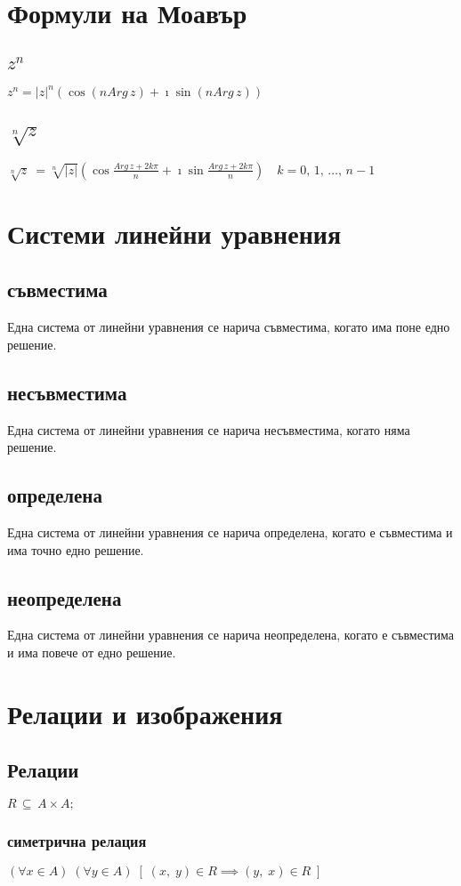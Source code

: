 \documentclass[12pt]{article}
\begin{document}
    \section{Формули на Моавър}
    \subsection{\(z^n\)}
    \(z^n = |z|^n(\cos{\left(nArg\,z\right)} + \imath\sin{\left(nArg\,z\right)})\)
    \subsection{\(\sqrt[n]z\)}
    \(\sqrt[n]z\ = \sqrt[n]{|z|}(\cos{\frac{Arg\,z + 2k\pi}{n}} + \imath\sin{\frac{Arg\,z + 2k\pi}{n}}) \quad k = 0, \, 1, \, \dots, \, n - 1\)
    \section{Системи линейни уравнения}
    \subsection{съвместима}
    Една система от линейни уравнения се нарича съвместима, когато има поне едно решение.
    \subsection{несъвместима}
    Една система от линейни уравнения се нарича несъвместима, когато няма решение.
    \subsection{определена}
    Една система от линейни уравнения се нарича определена, когато е съвместима и има точно едно решение.
    \subsection{неопределена}
    Една система от линейни уравнения се нарича неопределена, когато е съвместима и има повече от едно решение.
    \section{Релации и изображения}
    \subsection{Релации}
    \(R \, \subseteq \, A \times A;\)
    \subsubsection{симетрична релация}
    \((\forall x \in A) \; (\forall y \in A) \; [\; (x, \; y) \in R \implies (y, \; x) \in R \; ]\)
\end{document}
